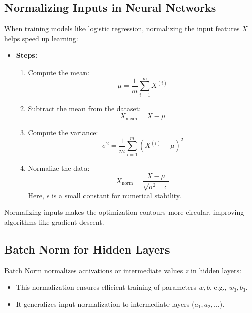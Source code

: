 \documentclass[letterpaper,12pt,notitlepage,twoside]{report}
\begin{document}
\subsection*{Normalizing Inputs in Neural Networks}
When training models like logistic regression, normalizing the input features \(X\) helps speed up learning:
\begin{itemize}[noitemsep, topsep=0pt]
    \item \textbf{Steps:}
    \begin{enumerate}[noitemsep, topsep=0pt]
        \item Compute the mean: 
        \[
        \mu = \frac{1}{m} \sum_{i=1}^m X^{(i)}
        \]
        \item Subtract the mean from the dataset: 
        \[
        X_{\text{mean}} = X - \mu
        \]
        \item Compute the variance: 
        \[
        \sigma^2 = \frac{1}{m} \sum_{i=1}^m (X^{(i)} - \mu)^2
        \]
        \item Normalize the data:
        \[
        X_{\text{norm}} = \frac{X - \mu}{\sqrt{\sigma^2 + \epsilon}}
        \]
        Here, \(\epsilon\) is a small constant for numerical stability.
    \end{enumerate}
\end{itemize}

Normalizing inputs makes the optimization contours more circular, improving algorithms like gradient descent.

\subsection*{Batch Norm for Hidden Layers}
Batch Norm normalizes activations or intermediate values \(z\) in hidden layers:
\begin{itemize}[noitemsep, topsep=0pt]
    \item This normalization ensures efficient training of parameters \(w, b\), e.g., \(w_3, b_3\).
    \item It generalizes input normalization to intermediate layers (\(a_1, a_2, \dots\)).
\end{itemize}
\end{document}
